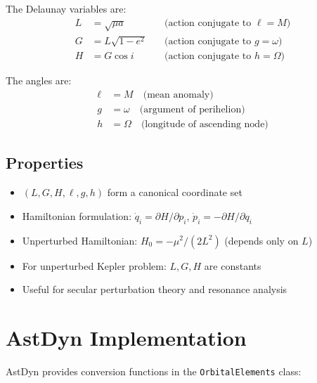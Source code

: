 The Delaunay variables are:
\begin{align}
    L &= \sqrt{\mu a} \quad &\text{(action conjugate to } \ell = M) \\
    G &= L\sqrt{1-e^2} \quad &\text{(action conjugate to } g = \omega) \\
    H &= G\cos i \quad &\text{(action conjugate to } h = \Omega)
\end{align}

The angles are:
\begin{align}
    \ell &= M \quad \text{(mean anomaly)} \\
    g &= \omega \quad \text{(argument of perihelion)} \\
    h &= \Omega \quad \text{(longitude of ascending node)}
\end{align}

\subsection{Properties}

\begin{itemize}
    \item $(L,G,H,\ell,g,h)$ form a canonical coordinate set
    \item Hamiltonian formulation: $\dot{q}_i = \partial H/\partial p_i$, $\dot{p}_i = -\partial H/\partial q_i$
    \item Unperturbed Hamiltonian: $H_0 = -\mu^2/(2L^2)$ (depends only on $L$)
    \item For unperturbed Kepler problem: $L, G, H$ are constants
    \item Useful for secular perturbation theory and resonance analysis
\end{itemize}

\section{AstDyn Implementation}

AstDyn provides conversion functions in the \texttt{OrbitalElements} class:

